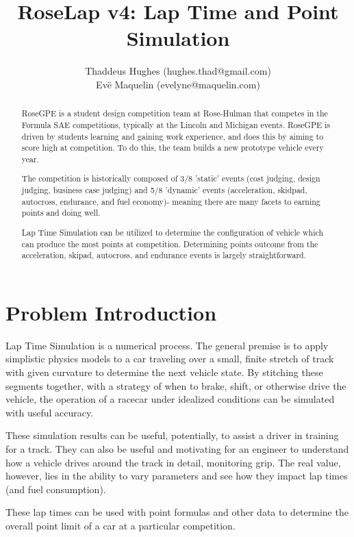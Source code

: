 \documentclass{article}
\begin{document}
\title{RoseLap v4: Lap Time and Point Simulation}
\author{Thaddeus Hughes (hughes.thad@gmail.com) \\ Evë Maquelin (evelyne@maquelin.com)}

\maketitle

\begin{abstract}
RoseGPE is a student design competition team at Rose-Hulman that competes in the Formula SAE competitions, typically at the Lincoln and Michigan events. RoseGPE is driven by students learning and gaining work experience, and does this by aiming to score high at competition. To do this, the team builds a new prototype vehicle every year.

The competition is historically composed of 3/8 'static' events (cost judging, design judging, business case judging) and 5/8 'dynamic' events (acceleration, skidpad, autocross, endurance, and fuel economy)- meaning there are many facets to earning points and doing well.

Lap Time Simulation can be utilized to determine the configuration of vehicle which can produce the most points at competition. Determining points outcome from the acceleration, skipad, autocross, and endurance events is largely straightforward.
\end{abstract}

\section{Problem Introduction}
Lap Time Simulation is a numerical process. The general premise is to apply simplistic physics models to a car traveling over a small, finite stretch of track with given curvature to determine the next vehicle state. By stitching these segments together, with a strategy of when to brake, shift, or otherwise drive the vehicle, the operation of a racecar under idealized conditions can be simulated with useful accuracy.

These simulation results can be useful, potentially, to assist a driver in training for a track. They can also be useful and motivating for an engineer to understand how a vehicle drives around the track in detail, monitoring grip. The real value, however, lies in the ability to vary parameters and see how they impact lap times (and fuel consumption).

These lap times can be used with point formulas and other data to determine the overall point limit of a car at a particular competition.
\end{document}
